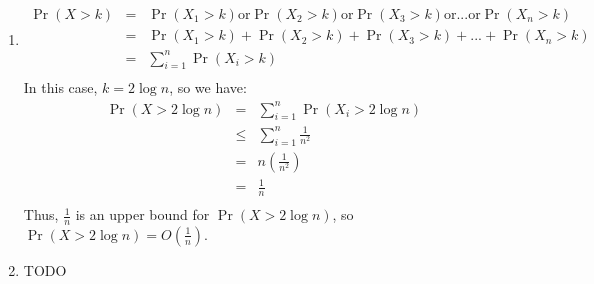 \documentclass[12pt]{article}
\begin{document}
\begin{enumerate}[label=(\alph*)]
  \item
  \begin{eqnarray*}
  \Pr(X > k) &=& \Pr(X_1 > k) \text{or} \Pr(X_2 > k) \text{or} \Pr(X_3 > k) \text{or} ... \text{or} \Pr(X_n > k)\\
  &=& \Pr(X_1 > k) + \Pr(X_2 > k) + \Pr(X_3 > k) + ... + \Pr(X_n > k)\\
  &=& \sum_{i=1}^n \Pr(X_i > k)\\
  \end{eqnarray*}
  In this case, $k = 2\log n$, so we have:
  \begin{eqnarray*}
  \Pr(X > 2\log n) &=& \sum_{i=1}^n \Pr(X_i > 2\log n)\\
  &\le& \sum_{i=1}^n \frac{1}{n^2}\\
  &=& n \left(\frac{1}{n^2}\right)\\
  &=& \frac{1}{n}\\
  \end{eqnarray*}
  Thus, $\frac{1}{n}$ is an upper bound for $\Pr(X > 2\log n)$, so $\Pr(X > 2\log n) = O\left(\frac{1}{n}\right)$.
  \item TODO
\end{enumerate}
\end{document}
